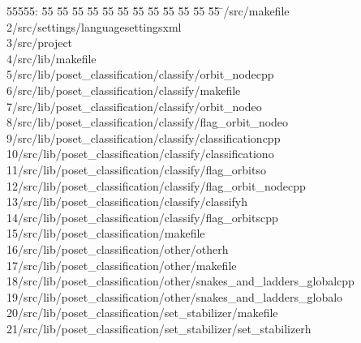 %
%
\begin{tabbing}
55555: \= 55 \= 55 \= 55 \= 55 \= 55 \= 55 \= 55 \= 55 \= 55 \= 55 \= 55 \= 55 \= \>/src/makefile\\[0pt]
2\>/src/settings/languagesettingsxml\\[0pt]
3\>/src/project\\[0pt]
4\>/src/lib/makefile\\[0pt]
5\>/src/lib/poset\_classification/classify/orbit\_nodecpp\\[0pt]
6\>/src/lib/poset\_classification/classify/makefile\\[0pt]
7\>/src/lib/poset\_classification/classify/orbit\_nodeo\\[0pt]
8\>/src/lib/poset\_classification/classify/flag\_orbit\_nodeo\\[0pt]
9\>/src/lib/poset\_classification/classify/classificationcpp\\[0pt]
10\>/src/lib/poset\_classification/classify/classificationo\\[0pt]
11\>/src/lib/poset\_classification/classify/flag\_orbitso\\[0pt]
12\>/src/lib/poset\_classification/classify/flag\_orbit\_nodecpp\\[0pt]
13\>/src/lib/poset\_classification/classify/classifyh\\[0pt]
14\>/src/lib/poset\_classification/classify/flag\_orbitscpp\\[0pt]
15\>/src/lib/poset\_classification/makefile\\[0pt]
16\>/src/lib/poset\_classification/other/otherh\\[0pt]
17\>/src/lib/poset\_classification/other/makefile\\[0pt]
18\>/src/lib/poset\_classification/other/snakes\_and\_ladders\_globalcpp\\[0pt]
19\>/src/lib/poset\_classification/other/snakes\_and\_ladders\_globalo\\[0pt]
20\>/src/lib/poset\_classification/set\_stabilizer/makefile\\[0pt]
21\>/src/lib/poset\_classification/set\_stabilizer/set\_stabilizerh\\[0pt]

\end{tabbing}
